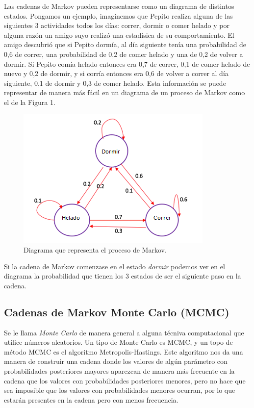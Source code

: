 \documentclass{article}
\begin{document}
Las cadenas de Markov pueden representarse como un diagrama de distintos estados. Pongamos un ejemplo, imaginemos que Pepito realiza alguna de las siguientes 3 actividades todos los d\'ias: correr, dormir o comer helado y por alguna raz\'on un amigo suyo realiz\'o una estad\'isica de su comportamiento. El amigo descubri\'o que si Pepito dorm\'ia, al d\'ia siguiente ten\'ia una probabilidad de 0,6 de correr, una probabilidad de 0,2 de comer helado y una de 0,2 de volver a dormir. Si Pepito com\'ia helado entonces era 0,7 de correr, 0,1 de comer helado de nuevo y 0,2 de dormir, y si corr\'ia entonces era 0,6 de volver a correr al d\'ia siguiente, 0,1 de dormir y 0,3 de comer helado. Esta informaci\'on se puede representar de manera m\'as f\'acil en un diagrama de un proceso de Markov como el de la Figura 1.


\begin{figure}[H]
\begin{center}
\includegraphics[scale=0.8]{cadenamarkovejemplo}
\caption{Diagrama que representa el proceso de Markov.}
\end{center}
\end{figure}
Si la cadena de Markov comenzase en el estado \textit{dormir} podemos ver en el diagrama la probabilidad que tienen los 3 estados de ser el siguiente paso en la cadena.



\subsection*{Cadenas de Markov Monte Carlo (MCMC)}

Se le llama \textit{Monte Carlo} de manera general a alguna t\'ecniva computacional que utilice n\'umeros aleatorios. Un tipo de Monte Carlo es MCMC, y un topo de m\'etodo MCMC es el algoritmo Metropolis-Hastings. Este algoritmo nos da una manera de construir una cadena donde los valores de alg\'un par\'ametro con probabilidades posteriores mayores aparezcan de manera m\'as frecuente en la cadena que los valores con probabilidades posteriores menores, pero no hace que sea imposible que los valores con probabilidades menores ocurran, por lo que estar\'an presentes en la cadena pero con menos frecuencia.
\end{document}
